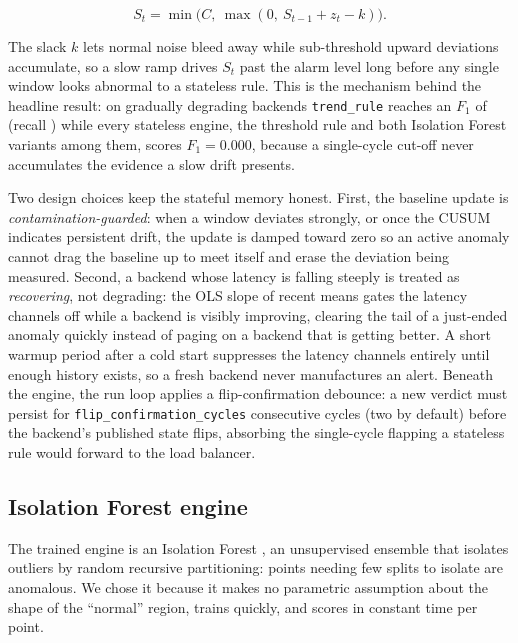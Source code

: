 \begin{equation}\label{imb:eq:cusum}
  S_t = \min\!\bigl(C,\ \max(0,\ S_{t-1} + z_t - k)\bigr).
\end{equation}

The slack \(k\) lets normal noise bleed away while sub-threshold upward
deviations accumulate, so a slow ramp drives \(S_t\) past the alarm level long
before any single window looks abnormal to a stateless rule. This is the mechanism
behind the headline result: on gradually degrading backends \texttt{trend\_rule}
reaches an \(F_1\) of \BManFone{} (recall \BManRecall{}) while every stateless
engine, the threshold rule and both Isolation Forest variants among them, scores
\(F_1 = 0.000\), because a single-cycle cut-off never accumulates the evidence a
slow drift presents.

Two design choices keep the stateful memory honest. First, the baseline update is
\emph{contamination-guarded}: when a window deviates strongly, or once the CUSUM
indicates persistent drift, the update is damped toward zero so an active anomaly
cannot drag the baseline up to meet itself and erase the deviation being measured.
Second, a backend whose latency is falling steeply is treated as
\emph{recovering}, not degrading: the OLS slope of recent means gates the latency
channels off while a backend is visibly improving, clearing the tail of a
just-ended anomaly quickly instead of paging on a backend that is getting better.
A short warmup period after a cold start suppresses the latency channels entirely
until enough history exists, so a fresh backend never manufactures an alert.
Beneath the engine, the run loop applies a flip-confirmation debounce: a new
verdict must persist for \texttt{flip\_confirmation\_cycles} consecutive cycles
(two by default) before the backend's published state flips, absorbing the
single-cycle flapping a stateless rule would forward to the load balancer.

\subsection{Isolation Forest engine}\label{imb:isoforest}

The trained engine is an Isolation Forest \cite{liu2008isolationforest}, an
unsupervised ensemble that isolates outliers by random recursive partitioning:
points needing few splits to isolate are anomalous. We chose it because it makes
no parametric assumption about the shape of the ``normal'' region, trains quickly,
and scores in constant time per point.

